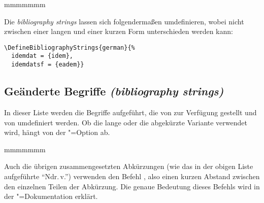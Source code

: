 \documentclass[ngerman]{scrartcl}
\begin{document}
\begin{labeling}{mmmmmmm}
\end{labeling}

Die \emph{bibliography strings} lassen sich folgendermaßen umdefinieren, wobei 
nicht zwischen einer langen und einer kurzen Form unterschieden werden kann:
\begin{lstlisting}
\DefineBibliographyStrings{german}{%
  idemdat = {idem},
  idemdatsf = {eadem}}
\end{lstlisting}

\subsection{Geänderte Begriffe \emph{(bibliography strings)}}
In dieser Liste werden die Begriffe aufgeführt, die von \bl{} zur Verfügung
gestellt und von \bldw{} umdefiniert werden. Ob die lange oder die abgekürzte
Variante verwendet wird, hängt von der \bl"=Option  ab. 

\begin{labeling}{mmmmmmm}
\end{labeling}
Auch die übrigen zusammengesetzten Abkürzungen (wie das in der obigen Liste aufgeführte \enquote{Ndr.\,v.}) 
verwenden den Befehl , also einen kurzen Abstand zwischen
den einzelnen Teilen der Abkürzung. Die genaue Bedeutung dieses Befehls wird
in der \bl"=Dokumentation erklärt.
\end{document}
